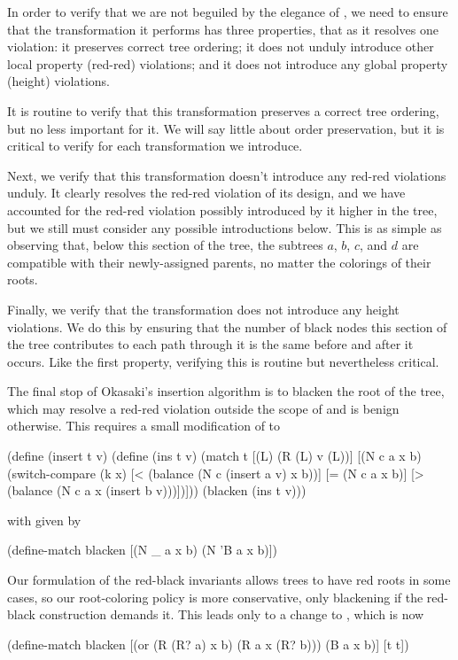 \documentclass[preprint]{sigplanconf}
\begin{document}
In order to verify that we are not beguiled by the elegance of , we need to ensure that the transformation it performs has three properties, that as it resolves one violation: it preserves correct tree ordering; it does not unduly introduce other local property (red-red) violations; and it does not introduce any global property (height) violations.

It is routine to verify that this transformation preserves a correct tree ordering, but no less important for it. We will say little about order preservation, but it is critical to verify for each transformation we introduce.

Next, we verify that this transformation doesn't introduce any red-red violations unduly. It clearly resolves the red-red violation of its design, and we have accounted for the red-red violation possibly introduced by it higher in the tree, but we still must consider any possible introductions below. This is as simple as observing that, below this section of the tree, the subtrees $a$, $b$, $c$, and $d$ are compatible with their newly-assigned parents, no matter the colorings of their roots.

Finally, we verify that the transformation does not introduce any height violations. We do this by ensuring that the number of black nodes this section of the tree contributes to each path through it is the same before and after it occurs. Like the first property, verifying this is routine but nevertheless critical.

The final stop of Okasaki's insertion algorithm is to blacken the root of the tree, which may resolve a red-red violation outside the scope of  and is benign otherwise. This requires a small modification of  to 
\begin{schemedisplay}
(define (insert t v)
  (define (ins t v)
    (match t
      [(L) (R (L) v (L))]
      [(N c a x b)
       (switch-compare
         (k x)
         [< (balance (N c (insert a v) x b))]
         [= (N c a x b)]
         [> (balance (N c a x (insert b v)))])]))
  (blacken (ins t v)))
\end{schemedisplay}
with  given by
\begin{schemedisplay}
(define-match blacken
  [(N _ a x b) (N 'B a x b)])
\end{schemedisplay}

Our formulation of the red-black invariants allows trees to have red roots in some cases, so our root-coloring policy is more conservative, only blackening if the red-black construction demands it. This leads only to a change to , which is now
\begin{schemedisplay}
(define-match blacken
  [(or (R (R? a) x b)
       (R a x (R? b)))
   (B a x b)]
  [t t])
\end{schemedisplay}
\end{document}
